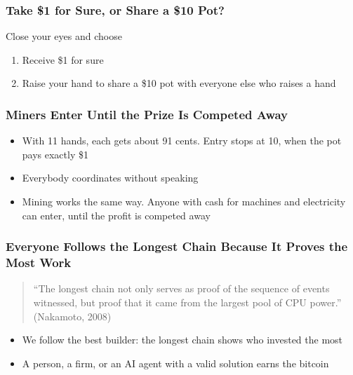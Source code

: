 \documentclass[aspectratio=169]{beamer}
\newcommand{\bi}{\begin{itemize}}
\newcommand{\ei}{\end{itemize}}
\newcommand{\m}{\item}
\newcommand{\be}{\begin{enumerate}}
\newcommand{\ee}{\end{enumerate}}
\begin{document}
\begin{frame}[label=appx-moneypot]
\frametitle{Take \$1 for Sure, or Share a \$10 Pot?}

\vfill
\begin{center}
{\Large Close your eyes and choose}
\end{center}
\vspace{4mm}
{\large
\be
\setlength{\itemsep}{4mm}
\m Receive \$1 for sure
\m Raise your hand to share a \$10 pot with everyone else who raises a hand
\ee}
\vfill
\par\vspace{0pt plus 1fill}\hfill{\scriptsize \hyperlink{main-difficulty}{}}
\end{frame}


\begin{frame}[label=appx-potlesson]
\frametitle{Miners Enter Until the Prize Is Competed Away}

\bi
\m With 11 hands, each gets about 91 cents. Entry stops at 10, when the pot pays exactly \$1
\m Everybody coordinates without speaking
\pause
\m Mining works the same way. Anyone with cash for machines and electricity can enter, until the profit is competed away
\ei
\par\vspace{0pt plus 1fill}\hfill{\scriptsize \hyperlink{main-difficulty}{}}
\end{frame}


\begin{frame}[label=appx-longest]
\frametitle{Everyone Follows the Longest Chain Because It Proves the Most Work}

\begin{quote}
``The longest chain not only serves as proof of the sequence of events witnessed, but proof that it came from the largest pool of CPU power.''
\hfill (Nakamoto, 2008)
\end{quote}

\bi
\m We follow the best builder: the longest chain shows who invested the most
\m A person, a firm, or an AI agent with a valid solution earns the bitcoin
\ei
\par\vspace{0pt plus 1fill}\hfill{\scriptsize \hyperlink{main-verse}{}}
\end{frame}
\end{document}
